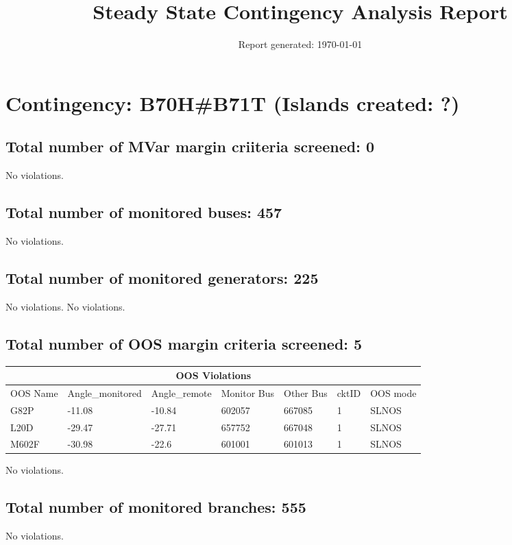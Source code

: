 \documentclass{article}%
\title{Steady State Contingency Analysis Report\vspace{-3ex}}%
\date{Report generated: \today\vspace{-2ex}}%
\begin{document}
%
\normalsize%
\maketitle%
\section*{Contingency: B70H\#B71T (Islands created: ?)}%
\label{sec:ContingencyB70HB71T(Islandscreated?)}%
\subsection*{Total number of MVar margin criiteria screened: 0}%
\label{subsec:TotalnumberofMVarmargincriiteriascreened0}%
No violations.

%
\subsection*{Total number of monitored buses: 457}%
\label{subsec:Totalnumberofmonitoredbuses457}%
No violations.

%
\subsection*{Total number of monitored generators: 225}%
\label{subsec:Totalnumberofmonitoredgenerators225}%
No violations.%
No violations.

%
\subsection*{Total number of OOS margin criteria screened: 5}%
\label{subsec:TotalnumberofOOSmargincriteriascreened5}%
\begin{tabularx}{\textwidth}{|  X | X | X | X | X | X | X |}%
\hline%
\multicolumn{7}{|c|}{OOS Violations}\\%
\hline%
OOS Name&Angle\_monitored&Angle\_remote&Monitor Bus&Other Bus&cktID&OOS mode\\%
\hline%
G82P&{-}11.08&{-}10.84&602057&667085&1&SLNOS\\%
\hline%
\hline%
L20D&{-}29.47&{-}27.71&657752&667048&1&SLNOS\\%
\hline%
\hline%
M602F&{-}30.98&{-}22.6&601001&601013&1&SLNOS\\%
\hline%
\end{tabularx}%
No violations.

%
\subsection*{Total number of monitored branches: 555}%
\label{subsec:Totalnumberofmonitoredbranches555}%
No violations.
\end{document}
